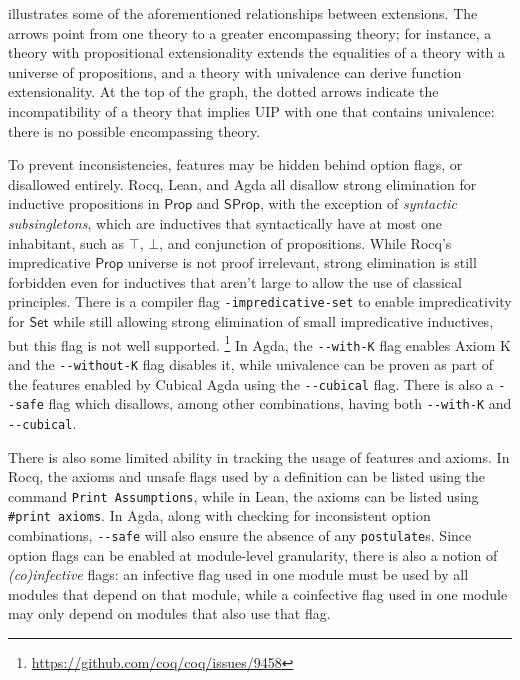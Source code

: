 \documentclass{article}
\newcommand{\kw}[1]{\mathsf{#1}}
\newcommand{\code}[1]{\texttt{#1}}
\begin{document}
 illustrates some of the aforementioned relationships between extensions.
The arrows point from one theory to a greater encompassing theory;
for instance, a theory with propositional extensionality extends the equalities
of a theory with a universe of propositions,
and a theory with univalence can derive function extensionality.
At the top of the graph, the dotted arrows indicate
the incompatibility of a theory that implies UIP with one that contains univalence:
there is no possible encompassing theory.

To prevent inconsistencies, features may be hidden behind option flags,
or disallowed entirely.
Rocq, Lean, and Agda all disallow strong elimination for inductive propositions
in $\kw{Prop}$ and $\kw{SProp}$,
with the exception of \emph{syntactic subsingletons},
which are inductives that syntactically have at most one inhabitant,
such as $\top$, $\bot$, and conjunction of propositions.
While Rocq's impredicative $\kw{Prop}$ universe is not proof irrelevant,
strong elimination is still forbidden even for inductives that aren't large
to allow the use of classical principles.
There is a compiler flag \code{-impredicative-set}
to enable impredicativity for $\kw{Set}$
while still allowing strong elimination of small impredicative inductives,
but this flag is not well supported.%
\footnote{\url{https://github.com/coq/coq/issues/9458}}
In Agda, the \code{-{}-with-K} flag enables Axiom K
and the \code{-{}-without-K} flag disables it,
while univalence can be proven as part of the features enabled by Cubical Agda
using the \code{-{}-cubical} flag.
There is also a \code{-{}-safe} flag which disallows,
among other combinations,
having both \code{-{}-with-K} and \code{-{}-cubical}.

There is also some limited ability in tracking the usage of features and axioms.
In Rocq, the axioms and unsafe flags used by a definition
can be listed using the command \code{Print Assumptions},
while in Lean, the axioms can be listed using \code{\#print axioms}.
In Agda, along with checking for inconsistent option combinations,
\code{-{}-safe} will also ensure the absence of any \code{postulate}s.
Since option flags can be enabled at module-level granularity,
there is also a notion of \emph{(co)infective} flags:
an infective flag used in one module
must be used by all modules that depend on that module,
while a coinfective flag used in one module
may only depend on modules that also use that flag.
\end{document}
